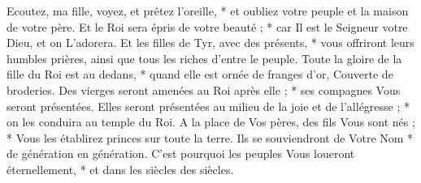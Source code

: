 Ecoutez, ma fille, voyez, et prêtez l'oreille, * et oubliez votre peuple et la maison de votre père.
\versseparator
Et le Roi sera épris de votre beauté ; * car Il est le Seigneur votre Dieu, et on L'adorera.
\versseparator
Et les filles de Tyr, avec des présents, * vous offriront leurs humbles prières, ainsi que tous les riches d'entre le peuple.
\versseparator
Toute la gloire de la fille du Roi est au dedans, * quand elle est ornée de franges d'or,
\versseparator
Couverte de broderies. Des vierges seront amenées au Roi après elle ; * ses compagnes Vous seront présentées.
\versseparator
Elles seront présentées au milieu de la joie et de l'allégresse ; * on les conduira au temple du Roi.
\versseparator
A la place de Vos pères, des fils Vous sont nés ; * Vous les établirez princes sur toute la terre.
\versseparator
Ils se souviendront de Votre Nom * de génération en génération.
\versseparator
C'est pourquoi les peuples Vous loueront éternellement, * et dans les siècles des siècles.
